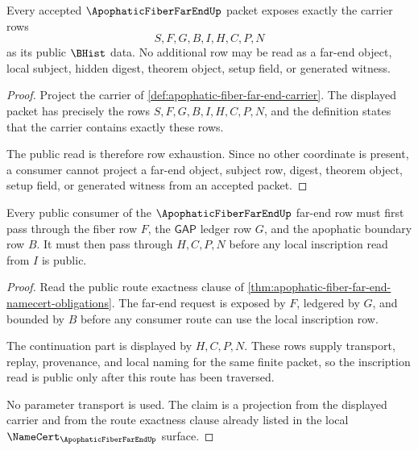 \begin{theorem}
\label{thm:apophatic-fiber-far-end-carrier-admission}
Every accepted $\ApophaticFiberFarEndUp$ packet exposes exactly the carrier rows
$$
S,F,G,B,I,H,C,P,N
$$
as its public $\BHist$ data. No additional row may be read as a far-end object, local subject, hidden digest, theorem object, setup field, or generated witness.
\end{theorem}
\begin{proof}
Project the carrier of \autoref{def:apophatic-fiber-far-end-carrier}. The displayed packet has precisely the rows $S,F,G,B,I,H,C,P,N$, and the definition states that the carrier contains exactly these rows.

The public read is therefore row exhaustion. Since no other coordinate is present, a consumer cannot project a far-end object, subject row, digest, theorem object, setup field, or generated witness from an accepted packet.
\end{proof}

\begin{theorem}
\label{thm:apophatic-fiber-far-end-ledger-boundary-route}
Every public consumer of the $\ApophaticFiberFarEndUp$ far-end row must first pass through the fiber row $F$, the $\mathsf{GAP}$ ledger row $G$, and the apophatic boundary row $B$. It must then pass through $H,C,P,N$ before any local inscription read from $I$ is public.
\end{theorem}
\begin{proof}
Read the public route exactness clause of \autoref{thm:apophatic-fiber-far-end-namecert-obligations}. The far-end request is exposed by $F$, ledgered by $G$, and bounded by $B$ before any consumer route can use the local inscription row.

The continuation part is displayed by $H,C,P,N$. These rows supply transport, replay, provenance, and local naming for the same finite packet, so the inscription read is public only after this route has been traversed.

No parameter transport is used. The claim is a projection from the displayed carrier and from the route exactness clause already listed in the local $\NameCert_{\ApophaticFiberFarEndUp}$ surface.
\end{proof}

